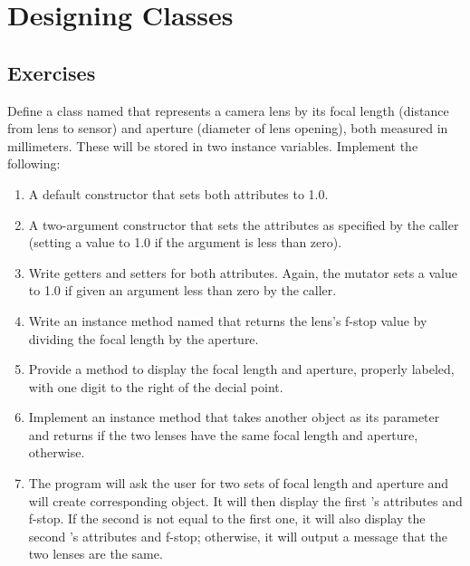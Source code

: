 \chapter{Designing Classes}

\section{Exercises}

\begin{exercise}
Define a class named  that represents a camera lens by its focal length (distance from lens to sensor) and aperture (diameter of lens opening), both measured in millimeters. These will be stored in two  instance variables. Implement the following:

\begin{enumerate}
\item A default constructor that sets both attributes to 1.0.

\item A two-argument constructor that sets the attributes as specified by the caller (setting a value to 1.0 if the argument is less than zero).

\item Write getters and setters for both attributes. Again, the mutator sets a value to 1.0 if given an argument less than zero by the caller.

\item Write an instance method named  that returns the lens's f-stop value by dividing the focal length by the aperture.

\item Provide a  method to display the focal length and aperture, properly labeled, with one digit to the right of the decial point.

\item Implement an  instance method that takes another  object as its parameter and returns  if the two lenses have the same focal length and aperture,  otherwise.

\item The  program will ask the user for two sets of focal length and aperture and will create corresponding  object. It will then display the first 's attributes and f-stop. If the second  is not equal to the first one, it will also display the second 's attributes and f-stop; otherwise, it will output a message that the two lenses are the same.
\end{enumerate}


\end{exercise}
